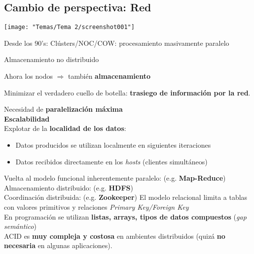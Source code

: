 \subsection{Cambio de perspectiva: Red}
\begin{center}
	\texttt{[image: "Temas/Tema 2/screenshot001"]}
\end{center}
Desde los 90’s: Clústers/NOC/COW: procesamiento masivamente paralelo

Almacenamiento no distribuido

Ahora los nodos $\Rightarrow$ también \textbf{almacenamiento}

Minimizar el verdadero cuello de botella: \textbf{trasiego de información por la red}.

Necesidad de \textbf{paralelización máxima}\\
\textbf{Escalabilidad}\\
Explotar de la \textbf{localidad de los datos}:
\begin{itemize}
	\item Datos producidos se utilizan localmente en siguientes iteraciones
\item Datos recibidos directamente en los \textit{hosts} (clientes simultáneos)
\end{itemize}
Vuelta al modelo funcional inherentemente paralelo: (e.g. \textbf{Map-Reduce})\\
Almacenamiento distribuido: (e.g. \textbf{HDFS})\\
Coordinación distribuida: (e.g. \textbf{Zookeeper})
El modelo relacional limita a tablas con valores primitivos y relaciones \textit{Primary Key/Foreign Key}\\
En programación se utilizan \textbf{listas, arrays, tipos de datos compuestos} (\textit{gap semántico})\\
ACID es \textbf{muy compleja y costosa} en ambientes distribuidos (quizá \textbf{no necesaria} en algunas aplicaciones).